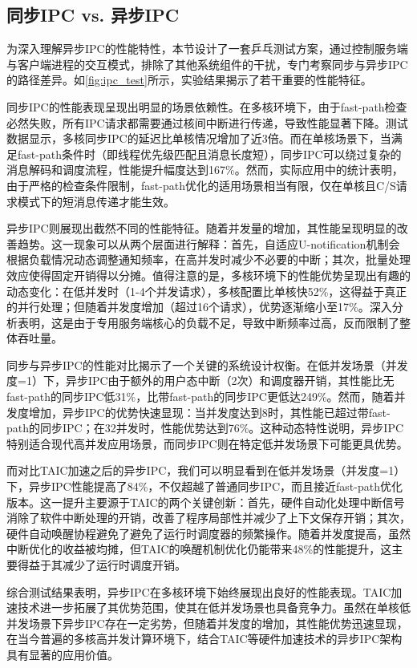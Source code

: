 \subsection{同步IPC vs. 异步IPC}
为深入理解异步IPC的性能特性，本节设计了一套乒乓测试方案，通过控制服务端与客户端进程的交互模式，排除了其他系统组件的干扰，专门考察同步与异步IPC的路径差异。如\ref{fig:ipc_test}所示，实验结果揭示了若干重要的性能特征。

同步IPC的性能表现呈现出明显的场景依赖性。在多核环境下，由于fast-path检查必然失败，所有IPC请求都需要通过核间中断进行传递，导致性能显著下降。测试数据显示，多核同步IPC的延迟比单核情况增加了近3倍。而在单核场景下，当满足fast-path条件时（即线程优先级匹配且消息长度短），同步IPC可以绕过复杂的消息解码和调度流程，性能提升幅度达到167\%。然而，实际应用中的统计表明，由于严格的检查条件限制，fast-path优化的适用场景相当有限，仅在单核且C/S请求模式下的短消息传递才能生效。

异步IPC则展现出截然不同的性能特征。随着并发量的增加，其性能呈现明显的改善趋势。这一现象可以从两个层面进行解释：首先，自适应U-notification机制会根据负载情况动态调整通知频率，在高并发时减少不必要的中断；其次，批量处理效应使得固定开销得以分摊。值得注意的是，多核环境下的性能优势呈现出有趣的动态变化：在低并发时（1-4个并发请求），多核配置比单核快52\%，这得益于真正的并行处理；但随着并发度增加（超过16个请求），优势逐渐缩小至17\%。深入分析表明，这是由于专用服务端核心的负载不足，导致中断频率过高，反而限制了整体吞吐量。

同步与异步IPC的性能对比揭示了一个关键的系统设计权衡。在低并发场景（并发度=1）下，异步IPC由于额外的用户态中断（2次）和调度器开销，其性能比无fast-path的同步IPC低31\%，比带fast-path的同步IPC更低达249\%。然而，随着并发度增加，异步IPC的优势快速显现：当并发度达到8时，其性能已超过带fast-path的同步IPC；在32并发时，性能优势达到76\%。这种动态特性说明，异步IPC特别适合现代高并发应用场景，而同步IPC则在特定低并发场景下可能更具优势。

而对比TAIC加速之后的异步IPC，我们可以明显看到在低并发场景（并发度=1）下，异步IPC性能提高了84\%，不仅超越了普通同步IPC，而且接近fast-path优化版本。这一提升主要源于TAIC的两个关键创新：首先，硬件自动化处理中断信号消除了软件中断处理的开销，改善了程序局部性并减少了上下文保存开销；其次，硬件自动唤醒协程避免了避免了运行时调度器的频繁操作。随着并发度提高，虽然中断优化的收益被均摊，但TAIC的唤醒机制优化仍能带来48\%的性能提升，这主要得益于其减少了运行时调度开销。

综合测试结果表明，异步IPC在多核环境下始终展现出良好的性能表现。TAIC加速技术进一步拓展了其优势范围，使其在低并发场景也具备竞争力。虽然在单核低并发场景下异步IPC存在一定劣势，但随着并发度的增加，其性能优势迅速显现，在当今普遍的多核高并发计算环境下，结合TAIC等硬件加速技术的异步IPC架构具有显著的应用价值。


